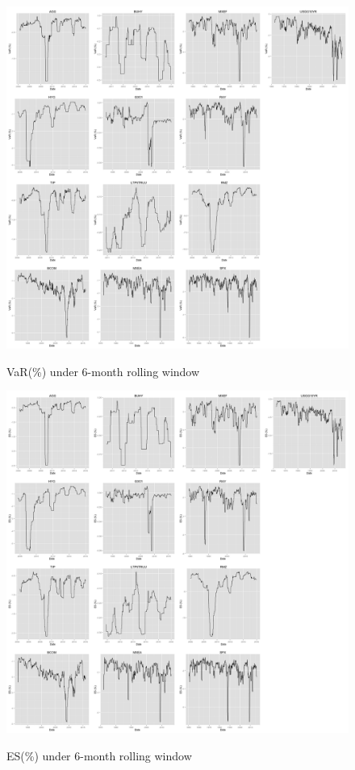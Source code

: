 \documentclass[12pt]{article}
\begin{document}
\begin{figure}[h]
\caption{VaR(\%) under 6-month rolling window}
\centering 
\includegraphics[width=16cm]{../results/VaR6mon}
\label{fig: VaR6mon}
\end{figure}

\begin{figure}[h]
\caption{ES(\%) under 6-month rolling window} 
\centering 
\includegraphics[width=16cm]{../results/ES6mon}
\label{fig: ES6mon}
\end{figure}



% 
% 
\end{document}
